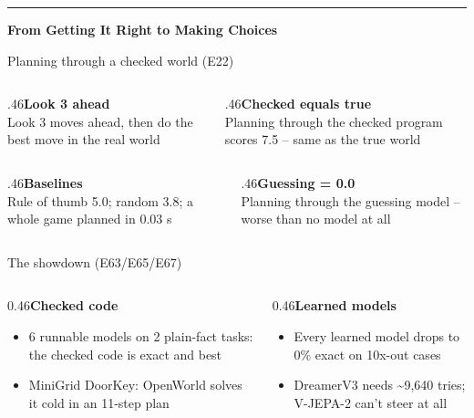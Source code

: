 \documentclass[aspectratio=169,11pt]{beamer}
\begin{document}
\begin{frame}[plain]\centering\vfill
{\color{owochre}\rule{40pt}{2.5pt}}\par\vskip10pt
{\color{owdeep}\bfseries\Large From Getting It Right to Making Choices\par}\vfill\end{frame}
\begin{frame}{Planning through a checked world (E22)}\vfill\begin{columns}[T]\begin{column}{.46\textwidth}{\color{owdeep}\bfseries Look 3 ahead}\\[2pt]{\color{owmuted}\small Look 3 moves ahead, then do the best move in the real world}\end{column}\begin{column}{.46\textwidth}{\color{owdeep}\bfseries Checked equals true}\\[2pt]{\color{owmuted}\small Planning through the checked program scores 7.5 -- same as the true world}\end{column}\end{columns}\vskip12pt\begin{columns}[T]\begin{column}{.46\textwidth}{\color{owdeep}\bfseries Baselines}\\[2pt]{\color{owmuted}\small Rule of thumb 5.0; random 3.8; a whole game planned in 0.03 s}\end{column}\begin{column}{.46\textwidth}{\color{owdeep}\bfseries Guessing = 0.0}\\[2pt]{\color{owmuted}\small Planning through the guessing model -- worse than no model at all}\end{column}\end{columns}\vfill\end{frame}
\begin{frame}{The showdown (E63/E65/E67)}\vfill
\begin{columns}[T]
\begin{column}{0.46\textwidth}{\color{owmuted}\bfseries\large Checked code}\par\medskip\begin{itemize}\small \item 6 runnable models on 2 plain-fact tasks: the checked code is exact and best
\item MiniGrid DoorKey: OpenWorld solves it cold in an 11-step plan\end{itemize}\end{column}
\begin{column}{0.46\textwidth}{\color{owteal}\bfseries\large Learned models}\par\medskip\begin{itemize}\small \item Every learned model drops to 0\% exact on 10x-out cases
\item DreamerV3 needs \textasciitilde{}9,640 tries; V-JEPA-2 can't steer at all\end{itemize}\end{column}
\end{columns}\vfill\end{frame}
\end{document}

